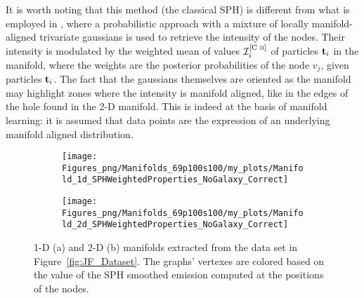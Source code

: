 It is worth noting that this method (the classical SPH) is different from what is employed in \citet{Canducci2021}, where a probabilistic approach with a mixture of locally manifold-aligned trivariate gaussians is used to retrieve the intensity of the nodes.
Their intensity is modulated by the weighted mean of \cii{} values $\mathcal{I}^{\text{[C~\textsc{ii}]{}}}_i$ of particles $\boldsymbol{\mathbf{t}}_i$ in the manifold, where the weights are the posterior probabilities of the node $v_j$, given particles $\boldsymbol{\mathbf{t}}_i$.
The fact that the gaussians themselves are oriented as the manifold may highlight zones where the intensity is manifold aligned, like in the edges of the hole found in the 2-D manifold.
This is indeed at the basis of manifold learning: it is assumed that data points are the expression of an underlying manifold aligned distribution.


\begin{figure}[ht]
\centering
\begin{subfigure}[t]{0.44\textwidth}
 \caption{}
 \label{subfig:1dManGraph}
 \texttt{[image: Figures\_png/Manifolds\_69p100s100/my\_plots/Manifold\_1d\_SPHWeightedProperties\_NoGalaxy\_Correct]}
\end{subfigure}
\begin{subfigure}[t]{0.53\textwidth}
 \caption{}
 \label{subfig:2dManGraph}
 \texttt{[image: Figures\_png/Manifolds\_69p100s100/my\_plots/Manifold\_2d\_SPHWeightedProperties\_NoGalaxy\_Correct]}
\end{subfigure}
\caption{1-D (a) and 2-D (b) manifolds extracted from the data set in Figure~\ref{fig:JF_Dataset}.
  The graphs' vertexes are colored based on the value of the SPH smoothed \cii{} emission computed at the positions of the nodes.}
\label{fig:ManCII}
\end{figure}


